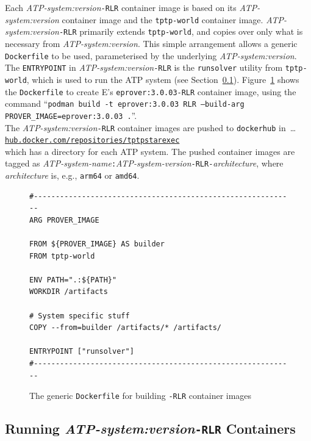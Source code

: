 \documentclass{easychair}
\begin{document}
Each {\em ATP-system:version}{\tt -RLR} container image is based on its
{\em ATP-system:version} container image and the {\tt tptp-world} container image.
{\em ATP-system:version}{\tt -RLR} primarily extends {\tt tptp-world}, and
copies over only what is necessary from {\em ATP-system:version}.
This simple arrangement allows a generic {\tt Dockerfile} to be used, parameterised by the
underlying {\em ATP-system:version}.
The {\tt ENTRYPOINT} in {\em ATP-system:version}{\tt -RLR} is the {\tt runsolver} utility from
{\tt tptp-world}, which is used to run the ATP system (see Section~\ref{Running}).
Figure~\ref{Dockerfile---RLR} shows the {\tt Dockerfile} to create E's {\tt eprover:3.0.03-RLR} 
container image, using the command 
``{\tt podman~build -t~eprover:3.0.03 RLR~--build-arg PROVER\_IMAGE=eprover:3.0.03~.}''. \\
The {\em ATP-system:version}{\tt -RLR} container images are pushed to {\tt dockerhub} in~\ldots\\
\hspace*{1cm}\href{https://hub.docker.com/repositories/tptpstarexec}{\tt hub.docker.com/repositories/tptpstarexec}\\
which has a directory for each ATP system.
The pushed container images are tagged as 
{\em ATP-system-name}{\tt :}{\em ATP-system-version}{\tt -RLR-}{\em architecture},
where {\em architecture} is, e.g., {\tt arm64} or {\tt amd64}.


\begin{figure}[htb]
{\small
\begin{verbatim}
#------------------------------------------------------------
ARG PROVER_IMAGE

FROM ${PROVER_IMAGE} AS builder
FROM tptp-world

ENV PATH=".:${PATH}"
WORKDIR /artifacts

# System specific stuff 
COPY --from=builder /artifacts/* /artifacts/

ENTRYPOINT ["runsolver"]
#------------------------------------------------------------
\end{verbatim}
}
\caption{The generic {\tt Dockerfile} for building {\tt -RLR} container images}
\label{Dockerfile---RLR}
\end{figure}

\subsection{Running {\em ATP-system:version}{\tt -RLR} Containers}
\label{Running}
\end{document}
